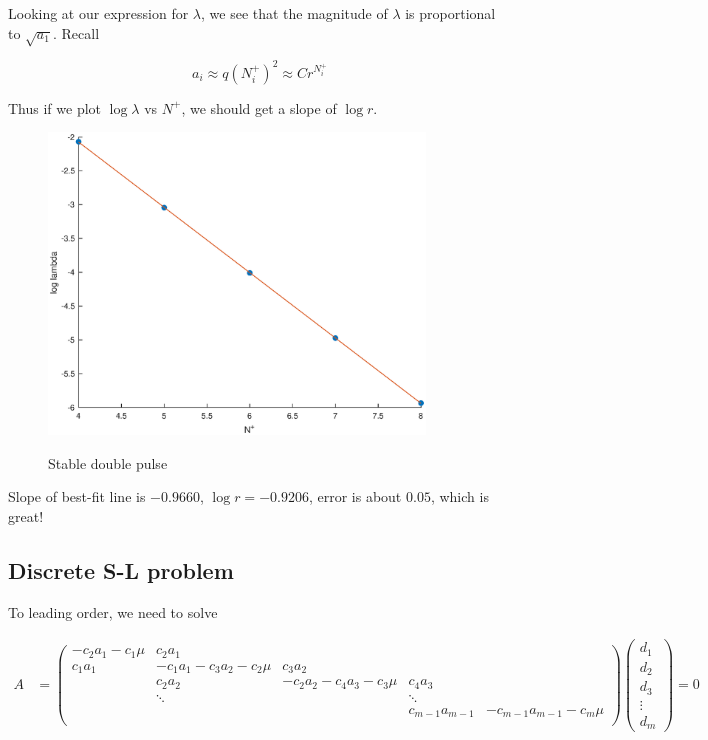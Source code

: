 \documentclass[12pt]{article}
\begin{document}
Looking at our expression for $\lambda$, we see that the magnitude of $\lambda$ is proportional to $\sqrt{a_1}$. Recall 

\[
a_i \approx q(N_i^+)^2 \approx C r^{N_i^+}
\] 

Thus if we plot $\log \lambda$ vs $N^+$, we should get a slope of $\log r$.

\begin{figure}[H]
\centering
\includegraphics[width=10cm]{dnlslog.eps}
\label{fig:essspec1}
\caption{Stable double pulse}
\end{figure}

Slope of best-fit line is $-0.9660$, $\log r = -0.9206$, error is about $0.05$, which is great!

\subsection*{Discrete S-L problem}

To leading order, we need to solve

\begin{align*}
A &= \begin{pmatrix}
-c_2 a_1 - c_1 \mu & c_2 a_1 & & &  \\
c_1 a_1 & -c_1 a_1 - c_3 a_2 - c_2 \mu & c_3 a_2 \\
& c_2 a_2 & -c_2 a_2 - c_4 a_3 - c_3 \mu & c_4 a_3 \\
& \ddots & & \ddots \\
& & & c_{m-1} a_{m-1} & -c_{m-1} a_{m-1} - c_m \mu \\
\end{pmatrix}
\begin{pmatrix}d_1 \\ d_2 \\ d_3 \\ \vdots \\ d_m \end{pmatrix} 
 = 0
\end{align*}
\end{document}
